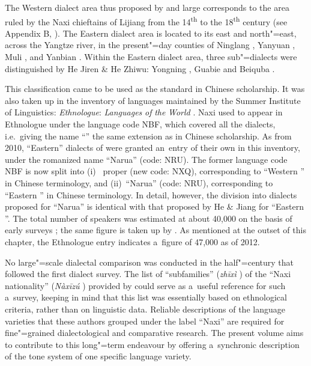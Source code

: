 {\noindent}The Western dialect area thus proposed by and large corresponds to the area ruled by the Naxi chieftains of Lijiang from the 14\textsuperscript{th} to the 18\textsuperscript{th} century (see Appendix B, ). The Eastern dialect area is located to its east and north"=east, across the Yangtze river, in the present"=day counties of Ninglang , Yanyuan , Muli , and Yanbian . Within the Eastern dialect area, three sub"=dialects were distinguished by He Jiren \& He Zhiwu: Yongning , Guabie  and Beiquba . 

This classification came to be used as the standard in Chinese scholarship. It was also taken up in the inventory of languages maintained by the Summer Institute of Linguistics: \textit{Ethnologue}: \textit{Languages} \textit{of} \textit{the} \textit{World} \citep{gordon2005}. Naxi used to appear in Ethnologue under the language code NBF, which covered all the dialects, i.e.\ giving the name “” the same extension as in Chinese scholarship. As from 2010, “Eastern” dialects of  were granted an~entry of their own in this inventory, under the romanized name “Narua” (code: NRU). The former language code NBF is now split into (i)~ proper (new code: NXQ), corresponding to “Western ” in Chinese terminology, and (ii)~“Narua” (code: NRU), corresponding to “Eastern ” in {Chinese} terminology. In detail, however, the division into dialects proposed for “Narua” is identical with that proposed by He \& Jiang for “Eastern ”. The total number of speakers was estimated at about 40,000 on the basis of early surveys \citep[107]{heetal1985}; the same figure is taken up by \citet{yang2009}. As mentioned at the outset of this chapter, the Ethnologue entry indicates a~figure of 47,000 as of 2012.

No large"=scale dialectal comparison was conducted in the half"=century that followed the first
dialect survey. The list of “subfamilies” 
(\textit{zhīxì} ) of the “Naxi nationality” (\textit{Nàxīzú} )
provided by \citet[5–9]{guoetal1994} could serve as a~useful reference for such a~survey, keeping in mind that this list was essentially based on ethnological criteria, rather
than on linguistic data. Reliable descriptions of the language varieties that these authors grouped under the label
“Naxi” are required for fine"=grained dialectological and comparative research. The present volume
aims to contribute to this long"=term endeavour by offering a~synchronic description of the tone system of one
specific language variety.

